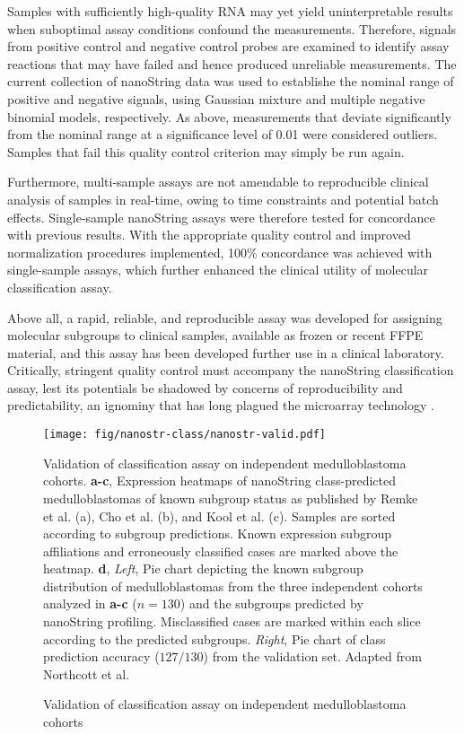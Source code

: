 \documentclass[11pt,letterpaper]{article}
\theoremstyle{definition}
\begin{document}
Samples with sufficiently high-quality RNA may yet yield uninterpretable results when suboptimal assay conditions confound the measurements. Therefore, signals from positive control and negative control probes are examined to identify assay reactions that may have failed and hence produced unreliable measurements. The current collection of nanoString data was used to establishe the nominal range of positive and negative signals, using Gaussian mixture and multiple negative binomial models, respectively. As above, measurements that deviate significantly from the nominal range at a significance level of 0.01 were considered outliers. Samples that fail this quality control criterion may simply be run again.

Furthermore, multi-sample assays are not amendable to reproducible clinical analysis of samples in real-time, owing to time constraints and potential batch effects. Single-sample nanoString assays were therefore tested for concordance with previous results. With the appropriate quality control and improved normalization procedures implemented, 100\% concordance was achieved with single-sample assays, which further enhanced the clinical utility of molecular classification assay.

Above all, a rapid, reliable, and reproducible assay was developed for assigning molecular subgroups to clinical samples, available as frozen or recent FFPE material, and this assay has been developed further use in a clinical laboratory. Critically, stringent quality control must accompany the nanoString classification assay, lest its potentials be shadowed by concerns of reproducibility and predictability, an ignominy that has long plagued the microarray technology .


\clearpage

\begin{figure}[h]
	\begin{center}
		\texttt{[image: fig/nanostr-class/nanostr-valid.pdf]}
	\end{center}
	\caption{Validation of classification assay on independent medulloblastoma cohorts}
	{
	Validation of classification assay on independent medulloblastoma cohorts.
	\textbf{a-c}, Expression heatmaps of nanoString class-predicted medulloblastomas of known subgroup status as published by Remke et al. (a), Cho et al. (b), and Kool et al. (c). Samples are sorted according to subgroup predictions. Known expression subgroup affiliations and erroneously classified cases are marked above the heatmap.
	\textbf{d}, \emph{Left}, Pie chart depicting the known subgroup distribution of medulloblastomas from the three independent cohorts analyzed in \textbf{a-c} ($n = 130$) and the subgroups predicted by nanoString profiling. Misclassified cases are marked within each slice according to the predicted subgroups. \emph{Right}, Pie chart of class prediction accuracy ($127/130$) from the validation set. Adapted from Northcott et al.
	}
	\label{fig:nanostr-valid}
\end{figure}
\end{document}
